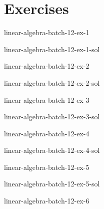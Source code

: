 \documentclass[preview]{standalone}
\begin{document}
\genpage

\section{Exercises}

\begin{snippetexercise}{linear-algebra-batch-12-ex-1}{}
    \todo
\end{snippetexercise}

\begin{snippetsolution}{linear-algebra-batch-12-ex-1-sol}{}
    \todo
\end{snippetsolution}

\begin{snippetexercise}{linear-algebra-batch-12-ex-2}{}
    \todo
\end{snippetexercise}

\begin{snippetsolution}{linear-algebra-batch-12-ex-2-sol}{}
    \todo
\end{snippetsolution}

\begin{snippetexercise}{linear-algebra-batch-12-ex-3}{}
    \todo
\end{snippetexercise}

\begin{snippetsolution}{linear-algebra-batch-12-ex-3-sol}{}
    \todo
\end{snippetsolution}

\begin{snippetexercise}{linear-algebra-batch-12-ex-4}{}
    \todo
\end{snippetexercise}

\begin{snippetsolution}{linear-algebra-batch-12-ex-4-sol}{}
    \todo
\end{snippetsolution}

\begin{snippetexercise}{linear-algebra-batch-12-ex-5}{}
    \todo
\end{snippetexercise}

\begin{snippetsolution}{linear-algebra-batch-12-ex-5-sol}{}
    \todo
\end{snippetsolution}

\begin{snippetexercise}{linear-algebra-batch-12-ex-6}{}
    \todo
\end{snippetexercise}
\end{document}
